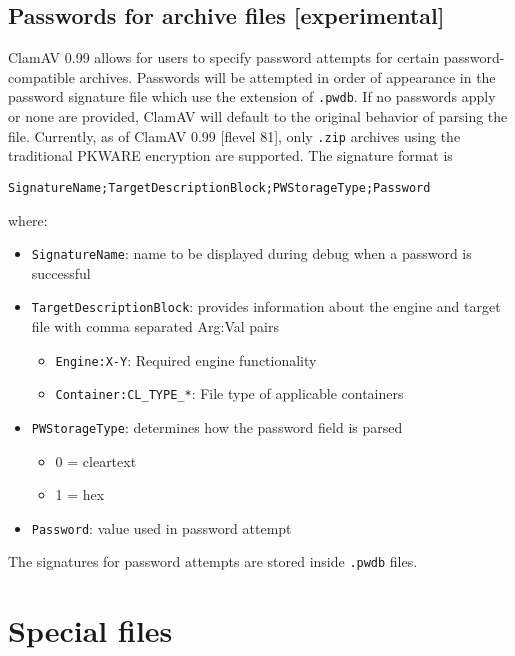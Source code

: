 \documentclass[a4paper,titlepage,12pt]{article}
\begin{document}
    \subsection{Passwords for archive files [experimental]}
    ClamAV 0.99 allows for users to specify password attempts for certain password-compatible archives.
    Passwords will be attempted in order of appearance in the password signature file which use the extension
    of \verb+.pwdb+. If no passwords apply or none are provided, ClamAV will default to the original
    behavior of parsing the file.
    Currently, as of ClamAV 0.99 [flevel 81], only \verb+.zip+ archives using the traditional PKWARE encryption 
    are supported.
    The signature format is
\begin{verbatim}
SignatureName;TargetDescriptionBlock;PWStorageType;Password
\end{verbatim}
    where:
    \begin{itemize}
        \item \verb+SignatureName+: name to be displayed during debug when a password is successful
        \item \verb+TargetDescriptionBlock+: provides information about the engine and target file with comma separated Arg:Val pairs
        \begin{itemize}
             \item \verb+Engine:X-Y+: Required engine functionality
             \item \verb+Container:CL_TYPE_*+: File type of applicable containers
        \end{itemize}
        \item \verb+PWStorageType+: determines how the password field is parsed
        \begin{itemize}
            \item 0 = cleartext
            \item 1 = hex
        \end{itemize}
        \item \verb+Password+: value used in password attempt
    \end{itemize}
    The signatures for password attempts are stored inside \verb+.pwdb+ files.

    \section{Special files}
\end{document}
